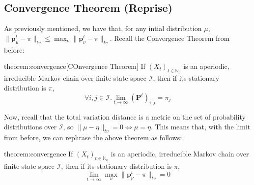 	\subsection{Convergence Theorem (Reprise)}
	As previously mentioned, we have that, for any intial distribution $\mu$, $\|
	\mathbf{p}_\mu^t-\pi \|_{tv} \leq \max_\nu \|\mathbf{p}_\nu^t-\pi\|_{tv}$. Recall the 
	Convergence Theorem from before:
	\begin{reptheorem}{theorem:convergence}[COnvergence Theorem]
		If $(X_t)_{t \in \mathbb{N}_0}$ is an aperiodic, irreducible Markov chain over
		finite state space $\mathcal{I}$, then if its stationary distribution is $\pi$,
		$$
			\forall i, j \in \mathcal{I} . \lim_{t \rightarrow \infty} 
			(\mathbf{P}^t)_{i,j} = \pi_j
		$$
	\end{reptheorem}
	Now, recall that the total variation distance is a metric on the set of probability 
	distributions over $\mathcal{I}$, so $\|\mu - \eta\|_{tv} = 0 \iff \mu = \eta$.
	This means that, with the limit from before, we can rephrase the above theorem as follows:
	\begin{reptheorem}{theorem:convergence}
		If $(X_t)_{t \in \mathbb{N}_0}$ is an aperiodic, irreducible Markov chain over  
		finite state space $\mathcal{I}$, then if its stationary distribution is $\pi$,
		$$
			\lim_{t\rightarrow\infty} \max_{\nu} \|\mathbf{p}_\nu^t - \pi\|_{tv} = 0
		$$
	\end{reptheorem}

